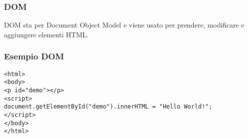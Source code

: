 \subsubsection{DOM}
DOM sta per Document Object Model e viene usato per prendere, modificare e aggiungere elementi HTML.

\subsubsection{Esempio DOM}
\begin{lstlisting}
<html>
<body>
<p id="demo"></p>
<script>
document.getElementById("demo").innerHTML = "Hello World!";
</script>
</body>
</html>  
\end{lstlisting}
